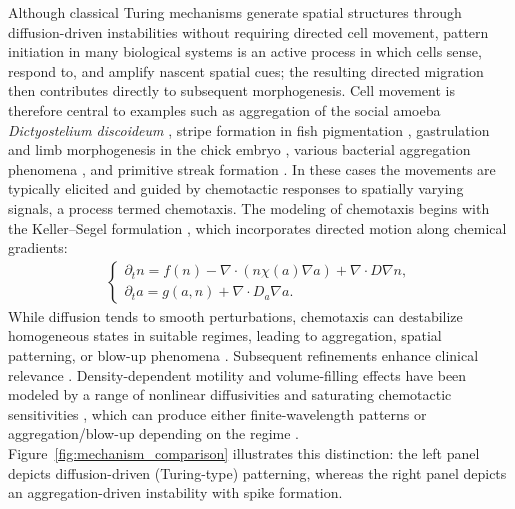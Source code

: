 \documentclass[pdflatex,sn-mathphys-ay]{sn-jnl}
\theoremstyle{thmstyleone}
\theoremstyle{definition}
\theoremstyle{remark}
\begin{document}
Although classical Turing mechanisms generate spatial structures through diffusion-driven instabilities without requiring directed cell movement, pattern initiation in many biological systems is an active process in which cells sense, respond to, and amplify nascent spatial cues; the resulting directed migration then contributes directly to subsequent morphogenesis. 
Cell movement is therefore central to examples such as aggregation of the social amoeba \textit{Dictyostelium discoideum} \citep{hofer1995dictyostelium}, stripe formation in fish pigmentation \citep{painter1999stripe,wang2025multi}, gastrulation and limb morphogenesis in the chick embryo \citep{li1999cell,yu2026rigorous,yang2002cell}, various bacterial aggregation phenomena \citep{budrene1991complex,yu2026beyond,budrene1995dynamics}, and primitive streak formation \citep{painter2000chemotactic,gao2022rolling}. 
In these cases the movements are typically elicited and guided by chemotactic responses to spatially varying signals, a process termed chemotaxis. 
The modeling of chemotaxis begins with the Keller--Segel formulation \citep{keller1970initiation,keller1971model,yu2026microscopic,murray2007mathematical}, which incorporates directed motion along chemical gradients:
\begin{align}
\label{eq:Keller_Segel}
\begin{cases}
\partial_{t} n = f(n) - \nabla \cdot \left( n \chi(a) \nabla a \right) + \nabla \cdot D \nabla n, \\
\partial_{t} a = g(a,n) + \nabla \cdot D_{a} \nabla a.
\end{cases}
\end{align}
While diffusion tends to smooth perturbations, chemotaxis can destabilize homogeneous states in suitable regimes, leading to aggregation, spatial patterning, or blow-up phenomena \citep{horstmann2005boundedness,jin2025critical,cai2026optimal,horstmann20031970,arumugam2021keller,jager1992explosions}. 
Subsequent refinements enhance clinical relevance \citep{martiel1987model,goldbeter1996biochemical,wang2026elliptic,monk1989cyclic,spiro1997model}. 
Density-dependent motility and volume-filling effects have been modeled by a
   range of nonlinear diffusivities and saturating chemotactic sensitivities \citep{hofer1995dictyostelium,kowalczyk2005preventing,yu2026fullcovariance,choi2010prevention,lushnikov2008macroscopic,wang2010chemotaxis},
   which can produce either finite-wavelength patterns or aggregation/blow-up
   depending on the regime \citep{bubba2019chemotaxis,wang2010chemotaxis}.
Figure~\ref{fig:mechanism_comparison} illustrates this distinction: the left panel depicts diffusion-driven (Turing-type) patterning, whereas the right panel depicts an aggregation-driven instability with spike formation.
\end{document}
